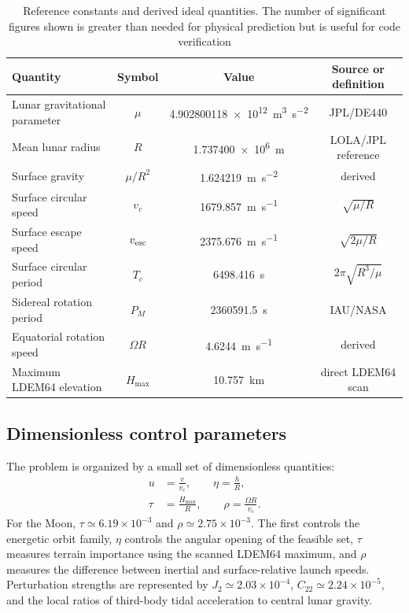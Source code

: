 \begin{table}[tbp]
\caption{Reference constants and derived ideal quantities. The number of significant figures shown is greater than needed for physical prediction but is useful for code verification}
\label{tab:constants}
\begin{ruledtabular}
\begin{tabular}{lccc}
Quantity & Symbol & Value & Source or definition \\
\hline
Lunar gravitational parameter & $\mu$ & \SI{4.902800118e12}{\metre^3\per\square\second} & JPL/DE440 \\
Mean lunar radius & $R$ & \SI{1.737400e6}{m} & LOLA/JPL reference \\
Surface gravity & $\mu/R^2$ & \SI{1.624219}{\metre\per\square\second} & derived \\
Surface circular speed & $v_c$ & \SI{1679.857}{\metre\per\second} & $\sqrt{\mu/R}$ \\
Surface escape speed & $v_{\rm esc}$ & \SI{2375.676}{\metre\per\second} & $\sqrt{2\mu/R}$ \\
Surface circular period & $T_c$ & \SI{6498.416}{s} & $2\pi\sqrt{R^3/\mu}$ \\
Sidereal rotation period & $P_M$ & \SI{2360591.5}{s} & IAU/NASA \\
Equatorial rotation speed & $\Omega R$ & \SI{4.6244}{\metre\per\second} & derived \\
Maximum LDEM64 elevation & $H_{\max}$ & \SI{10.757}{km} & direct LDEM64 scan
\end{tabular}
\end{ruledtabular}
\end{table}

\subsection{Dimensionless control parameters}

The problem is organized by a small set of dimensionless quantities:
\begin{align}
 u&=\frac{v}{v_c}, \qquad \eta=\frac{h}{R},\\
 \tau&=\frac{H_{\max}}{R}, \qquad \rho=\frac{\Omega R}{v_c}.
\label{eq:dimensionless}
\end{align}
For the Moon, $\tau\simeq6.19\times10^{-3}$ and $\rho\simeq2.75\times10^{-3}$. The first controls the energetic orbit family, $\eta$ controls the angular opening of the feasible set, $\tau$ measures terrain importance using the scanned LDEM64 maximum, and $\rho$ measures the difference between inertial and surface-relative launch speeds. Perturbation strengths are represented by $J_2\simeq2.03\times10^{-4}$, $C_{22}\simeq2.24\times10^{-5}$, and the local ratios of third-body tidal acceleration to central lunar gravity.

